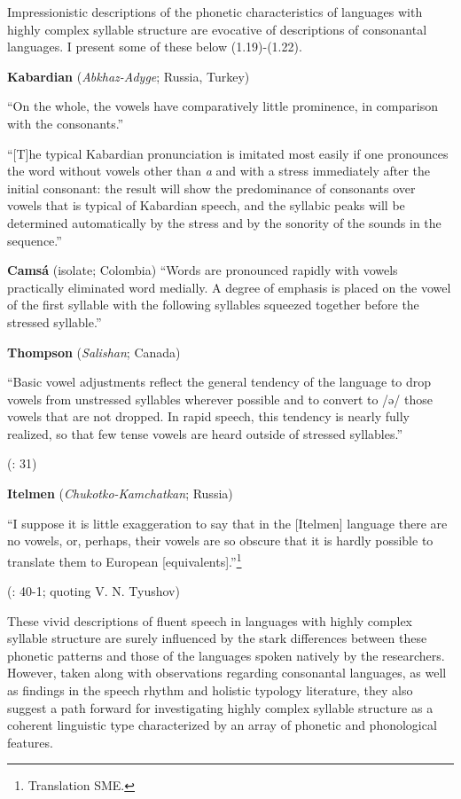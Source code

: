   Impressionistic descriptions of the phonetic characteristics of languages with highly complex syllable structure are evocative of descriptions of consonantal languages. I present some of these below (1.19)-(1.22).

\ea\label{ex:(1.19)}
  \textbf{Kabardian} (\textit{Abkhaz-Adyge}; Russia, Turkey)

“On the whole, the vowels have comparatively little prominence, in comparison with the consonants.”

\citep[24]{Kuipers1960}

“[T]he typical Kabardian pronunciation is imitated most easily if one pronounces the word without vowels other than \textit{a} and with a stress immediately after the initial consonant: the result will show the predominance of consonants over vowels that is typical of Kabardian speech, and the syllabic peaks will be determined automatically by the stress and by the sonority of the sounds in the sequence.” 

\citep[43]{Kuipers1960}

\z

\ea\label{ex:(1.20)}
  \textbf{Camsá} (isolate; Colombia)
“Words are pronounced rapidly with vowels practically eliminated word medially. A degree of emphasis is placed on the vowel of the first syllable with the following syllables squeezed together before the stressed syllable.” 
\z

\citep[86-7]{Howard1967}

\ea\label{ex:(1.21)}
  \textbf{Thompson} (\textit{Salishan}; Canada)

“Basic vowel adjustments reflect the general tendency of the language to drop vowels from unstressed syllables wherever possible and to convert to /ə/ those vowels that are not dropped. In rapid speech, this tendency is nearly fully realized, so that few tense vowels are heard outside of stressed syllables.”

(\citealt{ThompsonThompson1992}: 31)
\z

\ea\label{ex:(1.22)}
  \textbf{Itelmen} (\textit{Chukotko-Kamchatkan}; Russia)

“I suppose it is little exaggeration to say that in the [Itelmen] language there are no vowels, or, perhaps, their vowels are so obscure that it is hardly possible to translate them to European [equivalents].”\footnote{ \textrm{Translation SME.}}

(\citealt{Volodin1976}: 40-1; quoting V. N. Tyushov)
\z

  These vivid descriptions of fluent speech in languages with highly complex syllable structure are surely influenced by the stark differences between these phonetic patterns and those of the languages spoken natively by the researchers. However, taken along with observations regarding consonantal languages, as well as findings in the speech rhythm and holistic typology literature, they also suggest a path forward for investigating highly complex syllable structure as a coherent linguistic type characterized by an array of phonetic and phonological features.

